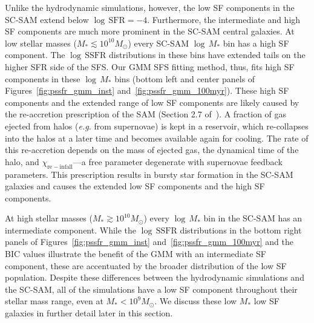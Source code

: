 \documentclass[preprint2,tighten]{aastex62}
\begin{document}
Unlike the hydrodynamic simulations, however, the low SF components in the 
SC-SAM extend below $\log\,\mathrm{SFR}{=}{-}4$. Furthermore, the intermediate 
and high SF components are much more prominent in the SC-SAM central galaxies. 
At low stellar masses ($M_* \lesssim 10^{10}M_\odot$) every SC-SAM $\log\,M_*$ 
bin has a high SF component. The $\log\,\mathrm{SSFR}$ distributions in these 
bins have extended tails on the higher SFR side of the SFS. Our GMM SFS fitting 
method, thus, fits high SF components in these $\log\,M_*$ bins (bottom left 
and center panels of Figures~\ref{fig:pssfr_gmm_inst} and~\ref{fig:pssfr_gmm_100myr}). 
{\color{red}
These high SF components and the extended range of low SF components are likely 
caused by the re-accretion prescription of the SAM (Section 2.7 of~\citealt{somerville2008a}).
A fraction of gas ejected from halos (\emph{e.g.} from supernovae) is kept in 
a reservoir, which re-collapses into the halos at a later time and becomes available 
again for cooling. The rate of this re-accretion depends on the mass of ejected gas, 
the dynamical time of the halo, and $\chi_\mathrm{re-infall}$---a free parameter 
degenerate with supernovae feedback parameters. This prescription results in bursty 
star formation in the SC-SAM galaxies and causes the extended low SF components and 
the high SF components. %
}

At high stellar masses ($M_* \gtrsim 10^{10}M_\odot$) every $\log\,M_*$ bin in the 
SC-SAM has an intermediate component. {\color{red} While the $\log\,\mathrm{SSFR}$ 
distributions in the bottom right panels of Figures~\ref{fig:pssfr_gmm_inst} 
and~\ref{fig:pssfr_gmm_100myr} and the BIC values illustrate the benefit of the 
GMM with an intermediate SF component, these are accentuated by the broader 
distribution of the low SF population. Despite these differences between the 
hydrodynamic simulations and the SC-SAM, all of the simulations have a low SF 
component throughout their stellar mass 
range, even at $M_* < 10^9M_\odot$. We discuss these low $M_*$ low SF galaxies 
in further detail later in this section.}
\end{document}
